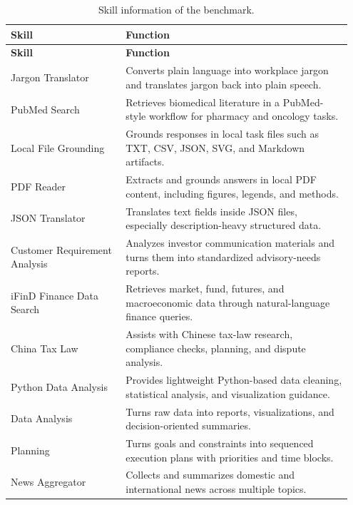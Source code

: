 \flushbottom

\par\medskip
\begingroup
\footnotesize
\setlength{\LTpre}{8pt}
\setlength{\LTpost}{0pt}
\setlength{\tabcolsep}{4pt}
\begin{longtable}{@{}p{0.32\linewidth}p{0.63\linewidth}@{}}
\caption{Skill information of the benchmark.}
\label{tab:benchmark_skills}\\
\toprule
\textbf{Skill} & \textbf{Function} \\
\midrule
\endfirsthead

\toprule
\textbf{Skill} & \textbf{Function} \\
\midrule
\endhead

\endfoot

\bottomrule
\endlastfoot

Jargon Translator & Converts plain language into workplace jargon and translates jargon back into plain speech. \\
PubMed Search & Retrieves biomedical literature in a PubMed-style workflow for pharmacy and oncology tasks. \\
Local File Grounding & Grounds responses in local task files such as TXT, CSV, JSON, SVG, and Markdown artifacts. \\
PDF Reader & Extracts and grounds answers in local PDF content, including figures, legends, and methods. \\
JSON Translator & Translates text fields inside JSON files, especially description-heavy structured data. \\
Customer Requirement Analysis & Analyzes investor communication materials and turns them into standardized advisory-needs reports. \\
iFinD Finance Data Search & Retrieves market, fund, futures, and macroeconomic data through natural-language finance queries. \\
China Tax Law & Assists with Chinese tax-law research, compliance checks, planning, and dispute analysis. \\
Python Data Analysis & Provides lightweight Python-based data cleaning, statistical analysis, and visualization guidance. \\
Data Analysis & Turns raw data into reports, visualizations, and decision-oriented summaries. \\
Planning & Turns goals and constraints into sequenced execution plans with priorities and time blocks. \\
News Aggregator & Collects and summarizes domestic and international news across multiple topics. \\

\end{longtable}
